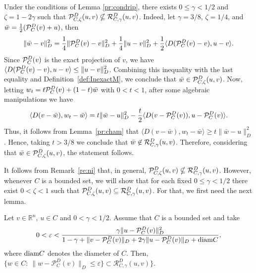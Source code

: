 \begin{remark}\normalfont \label{re:ni}
	Under the conditions of  Lemma \ref{pr:condrip}, there exists  $0 \leq \gamma <1/2$ and $\zeta=1-2\gamma$ such that ${\cal P}_{C,\zeta}^{D}(u, v)  \nsubseteq    {\cal R}_{C,\gamma}^{D}(u, v)$. Indeed,  let $\gamma=3/8$, $\zeta=1/4$,  and ${\bar w}=\frac{1}{2}({\cal P}_{C}^{D}(v)+u)$, then
	$$
		\displaystyle\|{\bar w}-v\|_D^2=\frac{1}{4}\| {\cal P}_{C}^{D}(v)-v\|_D^2 + \frac{1}{4}\|u-v\|_D^2 +\frac{1}{2} \langle D( {\cal P}_{C}^{D}(v) -v), u-v \rangle.
	$$
	Since  $ {\cal P}_{C}^{D}(v)$ is the exact projection of $v$,  we have   $\displaystyle\langle D( {\cal P}_{C}^{D}(v) -v), u-v \rangle \leq \|u-v\|_D^2$. Combining this inequality with  the last equality and Definition~\ref{def:InexactM}, we conclude that ${\bar w}\in {\cal P}_{C,\zeta}^{D}(u, v)$. Now,  letting $w_t=t{\cal P}_{C}^{D}(v)+ (1-t){\bar w}$  with $0<t<1$, after some algebraic  manipulations  we have
	$$
		\langle D(v-{\bar w}), w_t-{\bar w} \rangle=t\| {\bar w}-u\|_D^2 - \frac{t}{2} \langle D( v- {\cal P}_{C}^{D}(v)) , u-{\cal P}_{C}^{D}(v)  \rangle.
	$$
	Thus, it follows from Lemma~\ref{pr:cham} that $\displaystyle \langle D(v-{\bar w}), w_t-{\bar w} \rangle\geq t\| {\bar w}-u\|_D^2 $.  Hence,  taking  $t>3/8$ we conclude that ${\bar w}\not\in{\cal R}_{C,\gamma}^{D}(u, v)$.  Therefore, considering that ${\bar w}\in {\cal P}_{C,\zeta}^{D}(u, v)$, the statement follows.
\end{remark}\normalfont
It follows from Remark~\ref{re:ni} that, in general,  ${\cal P}_{C,\zeta}^{D}(u, v)  \nsubseteq    {\cal R}_{C,\gamma}^{D}(u, v)$. However, whenever $C$ is a bounded set,  we will show  that   for each  fixed  $0 \leq \gamma <1/2$  there exist $0 < \zeta  <1$ such that    ${\cal P}_{C,\zeta}^{D}(u, v)  \subseteq    {\cal R}_{C,\gamma}^{D}(u, v)$. For that, we first need the next lemma.
\begin{lemma} \label{le:epsi}
	Let $v \in {\mathbb R}^n$, $u \in C$ and $0<\gamma < 1/2$. Assume that $C$ is a bounded set and take
	\begin{equation} \label{eq:epsi}
		0<\varepsilon < \frac{\gamma \|u-\mathcal{P}_C^D(v)\|_D^2}{1-\gamma+\|v-\mathcal{P}_C^D(v)\|_D+ 2	\gamma\|u-\mathcal{P}_C^D(v)\|_D+\mbox{\normalfont diam}C },
	\end{equation}
	where $\mbox{\normalfont diam}C$ denotes the diameter of $C$. Then, $\{w\in C: ~ \|w-\mathcal{P}_C^D(v)\|_D\leq \varepsilon\}\subset\mathcal{R}_{C,\gamma}^D(u, v)\}$.
\end{lemma}
